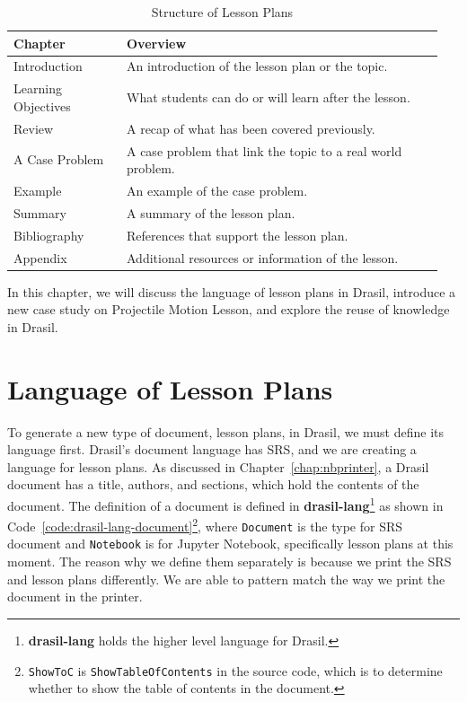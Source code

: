 \begin{longtable}[c]{|>{\raggedright}p{0.25\linewidth}|>{\raggedright\arraybackslash}p{0.7\linewidth}|}
	\caption{Structure of Lesson Plans} 
	\label{tab:lessonPlanstrucutre}                                            
	\\ \hline
	
	\rowcolor{McMasterMediumGrey}
	\textbf{Chapter} & \textbf{Overview}
	\\ \hline
	
	Introduction & An introduction of the lesson plan or the topic.
	\\ \hline
	Learning Objectives & What students can do or will learn after the 
	lesson.  
	\\ \hline
	Review & A recap of what has been covered previously.
	\\ \hline
	A Case Problem & A case problem that link the topic to a real world 
	problem.
	\\ \hline
	Example & An example of the case problem.
	\\ \hline
	Summary & A summary of the lesson plan.
	\\ \hline
	Bibliography & References that support the lesson plan.
	\\ \hline
	Appendix & Additional resources or information of the lesson.
	\\ \hline
\end{longtable}

In this chapter, we will discuss the language of lesson plans in Drasil, 
introduce a new case study on Projectile Motion Lesson, and explore the reuse 
of knowledge in Drasil.

\section{Language of Lesson Plans} \label{chap:lessonLang}
To generate a new type of document, lesson plans, in Drasil, we must define its 
language first. Drasil's document language has SRS, and we are creating a 
language for lesson plans. As discussed in Chapter~\ref{chap:nbprinter}, a 
Drasil document has a title, authors, and sections, which hold the contents 
of the document. The definition of a document is defined in 
\textbf{drasil-lang}\footnote{\textbf{drasil-lang} holds the higher level 
language for Drasil.} as shown in 
Code~\ref{code:drasil-lang-document}\footnote{\texttt{ShowToC} is 
\texttt{ShowTableOfContents} in the source code, which is to determine whether 
to show the table of contents in the document.}, where \texttt{Document} is the 
type for SRS document and \texttt{Notebook} is for Jupyter Notebook, 
specifically lesson plans at this moment. The reason why we define them 
separately is because we print the SRS and lesson plans differently. We are 
able to pattern match the way we print the document in the printer.

